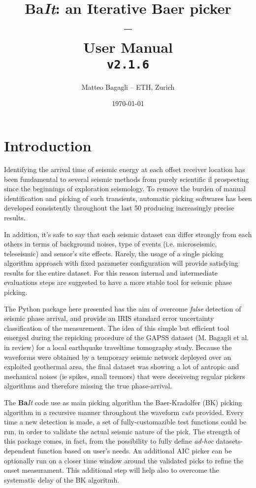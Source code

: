 \documentclass[11pt,a4paper,twocolumns]{article}
\title{\textbf{Ba\textit{It}: an Iterative Baer picker \\ -- \\ User Manual \\ \texttt{v2.1.6}}}
\author{Matteo Bagagli -- ETH, Zurich}
\date{\today}
\begin{document}
\newcommand{\bait}{\textbf{Ba}\textit{It} }
\newcommand{\mymail}{\texttt{matteo.bagagli@erdw.ethz.ch}}

\maketitle
\tableofcontents
\section{Introduction}
Identifying the arrival time of seismic energy at each offset receiver location has been fundamental to several seismic methods from purely scientific il prospecting since the beginnings of exploration seismology. 
To remove the burden of manual identification and picking of such transients, automatic picking softwares has been developed consistently throughout the last \SI{50}{\year} producing increasingly precise results.

In addition, it's safe to say that each seismic dataset can differ strongly from each others in terms of background noises, type of events (i.e. microseismic, teleseismic) and sensor's site effects.
Rarely, the usage of a single picking algorithm approach with fixed parameter configuration will provide satisfying results for the entire dataset. For this reason internal and intermediate evaluations steps are suggested to have a more stable tool for seismic phase picking.

The Python package here presented has the aim of overcome \emph{false} detection of seismic phase arrival, and provide an IRIS standard error uncertainty classification of the measurement. 
The idea of this simple but efficient tool emerged during the repicking procedure of the GAPSS dataset (M. Bagagli et al. in review) for a local earthquake traveltime tomography study. Because the waveforms were obtained by a temporary seismic network deployed over an exploited geothermal area, the final dataset was showing a lot of 
antropic and mechanical noises (ie spikes, small tremors) that were deceiveing regular pickers algorithms and therefore missing the true phase-arrival.

The \bait code use as main picking algorithm the Baer-Kradolfer (BK) picking algorithm \parencite[see][]{baer_automatic_1987} in a recursive manner throughout the waveform \emph{cuts} provided.
Every time a new detection is made, a set of fully-customazible test functions could be run, in order to validate the actual seismic nature of the pick. The strength of this package comes, in fact, from the possibility to fully define \emph{ad-hoc} datasets-dependent function based on user's needs.
An additional AIC picker can be optionally run on a closer time window around the validated picks to refine the onset measurament. This additional step will help also to overcome the systematic delay of the BK algoritmh.
\end{document}
